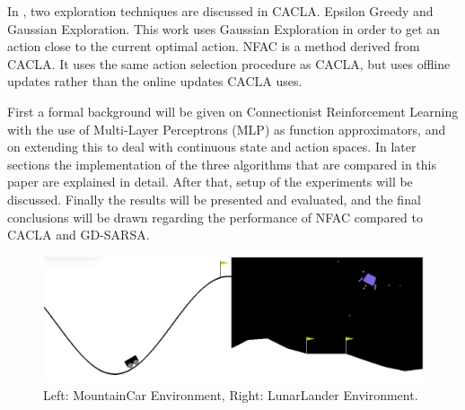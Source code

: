 In \cite{van2007reinforcement}, two exploration techniques are discussed in CACLA. Epsilon Greedy and Gaussian Exploration. This work uses Gaussian Exploration in order to get an action close to the current optimal action. NFAC \cite{zimmer2016neural} is a method derived from CACLA. It uses the same action selection procedure as CACLA, but uses offline updates rather than the online updates CACLA uses. 





First a formal background will be given on Connectionist Reinforcement Learning with the use of Multi-Layer Perceptrons (MLP) as function approximators, and on extending this to deal with continuous state and action spaces. In later sections the implementation of the three algorithms that are compared in this paper are explained in detail. After that, setup of the experiments will be discussed. Finally the results will be presented and evaluated, and the final conclusions will be drawn regarding the performance of NFAC compared to CACLA and GD-SARSA.

\begin{figure}[t]
 \centering 
    \includegraphics[width = 0.7\columnwidth]{figs/mountainlunar.png}
 \caption{Left: MountainCar Environment, Right: LunarLander Environment.}
\label{fig:mountainlunar}
\end{figure}
